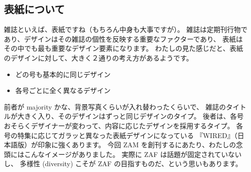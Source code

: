 \documentclass[dvipdfmx,autodetect-engine,10pt,b5paper,papersize,openany,dvipsnames]{jsbook}
\begin{document}
\begin{multicols}{2}

\section{表紙について}
雑誌といえば、表紙ですね（もちろん中身も大事ですが）。
雑誌は定期刊行物であり、デザインはその雑誌の個性を反映する重要なファクターであり、
表紙はその中でも最も重要なデザイン要素になります。
わたしの見た感じだと、表紙のデザインに対して、大きく２通りの考え方があるようです。
\begin{itemize}
\item どの号も基本的に同じデザイン
\item 各号ごとに全く異なるデザイン
\end{itemize}
前者が majority かな、背景写真くらいが入れ替わったくらいで、
雑誌のタイトルが大きく入り、そのデザインはずっと同じデザインのタイプ。
後者は、各号おそらくデザイナーが変わって、内容に応じたデザインを採用するタイプ。
各号の特集に応じてガラッと異なった表紙デザインになっている
『WIRED』（日本語版）が印象に強くあります。
今回 ZAM を創刊するにあたり、わたしの念頭にはこんなイメージがありました。
実際に ZAF は話題が固定されていないし、
多様性 (diversity) こそが ZAF の目指すものだ、という思いもあります。

\end{multicols}

\vspace{6cm}

\end{document}
